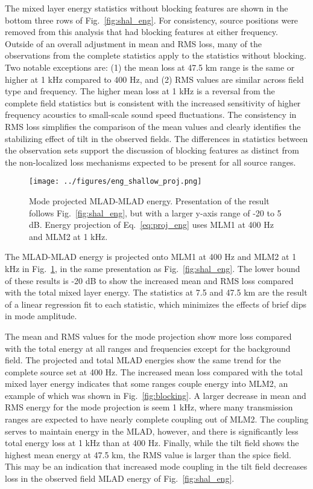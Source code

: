 \documentclass[preprint,NumberedRefs]{JASA}
\begin{document}
The mixed layer energy statistics without blocking features are shown in the bottom three rows of Fig.~\ref{fig:shal_eng}. For consistency, source positions were removed from this analysis that had blocking features at either frequency. Outside of an overall adjustment in mean and RMS loss, many of the observations from the complete statistics apply to the statistics without blocking. Two notable exceptions are: (1) the mean loss at 47.5 km range is the same or higher at 1 kHz compared to 400 Hz, and (2) RMS values are similar across field type and frequency. The higher mean loss at 1 kHz is a reversal from the complete field statistics but is consistent with the increased sensitivity of higher frequency acoustics to small-scale sound speed fluctuations. The consistency in RMS loss simplifies the comparison of the mean values and clearly identifies the stabilizing effect of tilt in the observed fields. The differences in statistics between the observation sets support the discussion of blocking features as distinct from the non-localized loss mechanisms expected to be present for all source ranges.

\begin{figure}
\texttt{[image: ../figures/eng\_shallow\_proj.png]}
    \caption{Mode projected MLAD-MLAD energy. Presentation of the result follows Fig.~\ref{fig:shal_eng}, but with a larger y-axis range of -20 to 5 dB. Energy projection of Eq.~\eqref{eq:proj_eng} uses MLM1 at 400 Hz and MLM2 at 1 kHz.}
    \label{fig:shal_proj}
\end{figure}
The MLAD-MLAD energy is projected onto MLM1 at 400 Hz and MLM2 at 1 kHz in Fig.~\ref{fig:shal_proj}, in the same presentation as Fig.~\ref{fig:shal_eng}. The lower bound of these results is -20 dB to show the increased mean and RMS loss compared with the total mixed layer energy. The statistics at 7.5 and 47.5 km are the result of a linear regression fit to each statistic, which minimizes the effects of brief dips in mode amplitude.

The mean and RMS values for the mode projection show more loss compared with the total energy at all ranges and frequencies except for the background field. The projected and total MLAD energies show the same trend for the complete source set at 400 Hz. The increased mean loss compared with the total mixed layer energy indicates that some ranges couple energy into MLM2, an example of which was shown in Fig.~\ref{fig:blocking}. A larger decrease in mean and RMS energy for the mode projection is seem 1 kHz, where many transmission ranges are expected to have nearly complete coupling out of MLM2. The coupling serves to maintain energy in the MLAD, however, and there is significantly less total energy loss at 1 kHz than at 400 Hz. Finally, while the tilt field shows the highest mean energy at 47.5 km, the RMS value is larger than the spice field. This may be an indication that increased mode coupling in the tilt field decreases loss in the observed field MLAD energy of Fig.~\ref{fig:shal_eng}.
\end{document}
